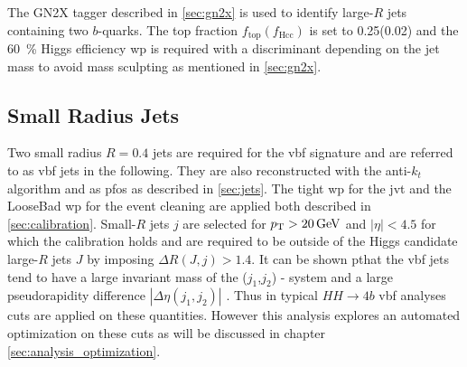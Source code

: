  The GN2X tagger described in \ref{sec:gn2x} is used to identify large-$R$ jets containing two $b$-quarks. The top fraction $f_\text{top}(f_\text{Hcc})$ is set to 0.25(0.02) and the \qty[]{60}{\percent} Higgs efficiency \ac{wp} is required with a discriminant depending on the jet mass to avoid mass sculpting as mentioned in \ref{sec:gn2x}.


\subsection{Small Radius Jets}
Two small radius $R=0.4$ jets are required for the \ac{vbf} signature and are referred to as \ac{vbf} jets in the following. They are also reconstructed with the anti-$k_t$ algorithm and as \acp{pfo} as described in \ref{sec:jets}. The tight \ac{wp} for the \ac{jvt} and the LooseBad \ac{wp} for the event cleaning are applied both described in \ref{sec:calibration}. Small-$R$ jets $j$ are selected for $p_{\text{T}}>\qty[]{20}{GeV}$ and $|\eta|<4.5$ for which the calibration holds and are required to be outside of the Higgs candidate large-$R$ jets $J$ by imposing $\Delta R(J,j) > 1.4$. It can be shown pthat the vbf jets tend to have a large invariant mass of the ($j_1$,$j_2$) - system and a large pseudorapidity difference $|\Delta\eta(j_1,j_2)|$ \citep{rauch2016vectorboson}. Thus in typical $HH\rightarrow 4b$ \ac{vbf} analyses cuts are applied on these quantities. However this analysis explores an automated optimization on these cuts as will be discussed in chapter \ref{sec:analysis_optimization}.

